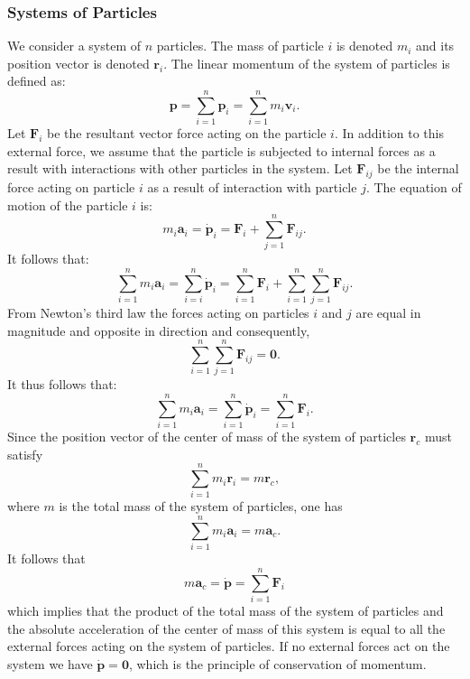 \subsubsection{Systems of Particles}
We consider a system of $n$ particles. The mass of particle $i$ is denoted $m_i$ and its position vector is denoted $\textbf{r}_i$. The linear momentum of the system of particles is defined as:
\[ 
\textbf{p} = \sum_{i = 1}^{n} \textbf{p}_i = \sum_{i = 1}^{n} m_i \textbf{v}_i
.\]
Let $\textbf{F}_i$ be the resultant vector force acting on the particle $i$. In addition to this external force, we assume that the particle is subjected to internal forces as a result with interactions with other particles in the system. Let $\textbf{F}_{ij}$ be the internal force acting on particle $i$ as a result of interaction with particle $j$. The equation of motion of the particle $i$ is:
\[ 
  m_i \textbf{a}_i = \dot{\textbf{p}}_i = \textbf{F}_i + \sum_{j = 1}^{n} \textbf{F}_{ij}
.\]
It follows that:
\[ 
  \sum_{i = 1}^{n} m_i \textbf{a}_i = \sum_{i = i}^{n} \dot{\textbf{p}}_i = \sum_{i = 1}^{n} \textbf{F}_i + \sum_{i = 1}^{n} \sum_{j = 1}^{n} \textbf{F}_{ij}
.\]
From Newton's third law the forces acting on particles $i$ and $j$ are equal in magnitude and opposite in direction and consequently,
\[ 
\sum_{i = 1}^{n} \sum_{j = 1}^{n} \textbf{F}_{ij} = \textbf{0}
.\]
It thus follows that:
\[ 
  \sum_{i = 1}^{n} m_i \textbf{a}_i = \sum_{i = 1}^{n} \dot{\textbf{p}}_i = \sum_{i = 1}^{n} \textbf{F}_i
.\]
Since the position vector of the center of mass of the system of particles $\textbf{r}_c$ must satisfy
\[ 
\sum_{i = 1}^{n} m_i \textbf{r}_i = m \textbf{r}_c
,\]
where $m$ is the total mass of the system of particles, one has
\[ 
\sum_{i = 1}^{n} m_i \textbf{a}_i = m \textbf{a}_c
.\]
It follows that
\[ 
  m \textbf{a}_c = \dot{\textbf{p}} = \sum_{i = 1}^{n} \textbf{F}_i
\]
which implies that the product of the total mass of the system of particles and the absolute acceleration of the center of mass of this system is equal to all the external forces acting on the system of particles. If no external forces act on the system we have $\dot{\textbf{p}} = \textbf{0}$, which is the principle of conservation of momentum. 


